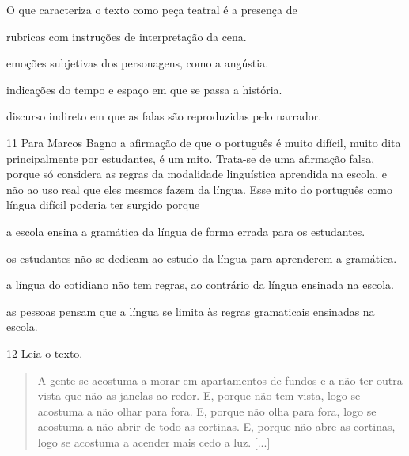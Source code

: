 O que caracteriza o texto como peça teatral é a presença de

\begin{escolha}
\item rubricas com instruções de interpretação da cena.

\item emoções subjetivas dos personagens, como a angústia.

\item indicações do tempo e espaço em que se passa a história.

\item discurso indireto em que as falas são reproduzidas pelo narrador.
\end{escolha}

\num{11} Para Marcos Bagno a afirmação de que o português é muito difícil,
muito dita principalmente por estudantes, é um mito. Trata-se de uma afirmação
falsa, porque só considera as regras da modalidade linguística aprendida na
escola, e não ao uso real que eles mesmos fazem da língua. Esse 
mito do português como língua difícil poderia ter surgido porque

\begin{escolha}
\item a escola ensina a gramática da língua de forma errada para os
estudantes.

\item os estudantes não se dedicam ao estudo da língua para aprenderem a
gramática.

\item a língua do cotidiano não tem regras, ao contrário da língua ensinada
na escola.

\item as pessoas pensam que a língua se limita às regras gramaticais ensinadas na escola.
\end{escolha}

\num{12} Leia o texto.

\begin{quote}
A gente se acostuma a morar em apartamentos de fundos e a não ter outra
vista que não as janelas ao redor. E, porque não tem vista, logo se
acostuma a não olhar para fora. E, porque não olha para fora, logo se
acostuma a não abrir de todo as cortinas. E, porque não abre as
cortinas, logo se acostuma a acender mais cedo a luz. {[}...{]}

\end{quote}

